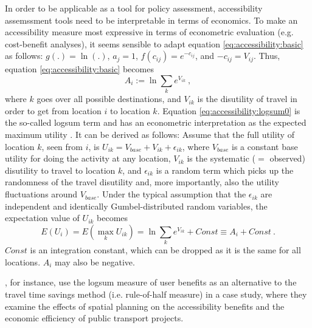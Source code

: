 In order to be applicable as a tool for policy assessment, accessibility assemssment tools need to be interpretable in
terms of economics. To make an accessibility measure most expressive in terms of econometric evaluation (e.g. cost-benefit 
analyses), it seems sensible to adapt equation \ref{eq:accessibility:basic} as 
follows: $g(.) = \ln(.)$, $a_j = 1$, $f(c_{ij}) = e^{-c_{ij}}$, and $-c_{ij} = V_{ij}$. Thus, 
equation \ref{eq:accessibility:basic} becomes
\begin{equation}
	A_i := \ln \sum_k e^{V_{ik}} \ ,
	\label{eq:accessibility:logsum0}
\end{equation}
where $k$ goes over all possible destinations, and $V_{ik}$ is the
disutility of travel in order to get from location $i$ to location
$k$. Equation \ref{eq:accessibility:logsum0} is the so-called logsum term and has an econometric interpretation 
as the expected maximum utility \citep[e.g.][]{Ben-AkivaBook, DejongEtc2005LogsumAsEvalDutchReport}. It can be 
derived as follows: Assume that the full utility of location $k$, seen 
from $i$, is $U_{ik} = V_{base} + V_{ik} + \epsilon_{ik}$, where $V_{base}$ is a constant 
base utility for doing the activity at any location, $V_{ik}$ is the systematic ($=$ observed) disutility to travel to 
location $k$, and $\epsilon_{ik}$ is a random term which picks up the randomness of the travel disutility and, more 
importantly, also the utility fluctuations around $V_{base}$.  Under the typical assumption that the $\epsilon_{ik}$ 
are independent and identically Gumbel-distributed random variables, the expectation value of $U_{ik}$ becomes
\begin{equation}
	E(U_i) = E(\max_k U_{ik}) = \ln \sum_k e^{V_{ik}} + Const \equiv A_i + Const \ .
\end{equation}
$Const$ is an integration constant, which can be dropped as it is the same for all locations. $A_i$ may also be negative.

\citet{GeuersEtAl20xx}, for instance, use the logsum measure of user benefits as an alternative to the travel time 
savings method (i.e. rule-of-half measure) in a case study, where they examine the effects of spatial planning on 
the accessibility benefits and the economic efficiency of public transport projects.


